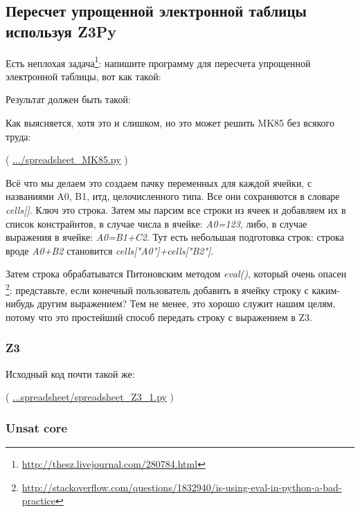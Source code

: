 \subsection{Пересчет упрощенной электронной таблицы используя Z3Py}

\renewcommand{\CURPATH}{equations/spreadsheet}

Есть неплохая задача\footnote{\url{http://thesz.livejournal.com/280784.html}}:
напишите программу для пересчета упрощенной электронной таблицы, вот как такой:



Результат должен быть такой:



Как выясняется, хотя это и слишком, но это может решить MK85 без всякого труда:



( \url{.../spreadsheet_MK85.py} )

Всё что мы делаем это создаем пачку переменных для каждой ячейки, с названиями 
A0, B1, итд, целочисленного типа.
Все они сохраняются в словаре \textit{cells[]}.
Ключ это строка.
Затем мы парсим все строки из ячеек и добавляем их в список констрайнтов, в случае числа в ячейке: \textit{A0=123},
либо, в случае выражения в ячейке: \textit{A0=B1+C2}.
Тут есть небольшая подготовка строк: строка вроде \textit{A0+B2} становится \textit{cells["A0"]+cells["B2"]}.

Затем строка обрабатыватся Питоновским методом \textit{eval()}, который очень опасен
\footnote{\url{http://stackoverflow.com/questions/1832940/is-using-eval-in-python-a-bad-practice}}:
представьте, если конечный пользователь добавить в ячейку строку с каким-нибудь другим выражением?
Тем не менее, это хорошо служит нашим целям, потому что это простейший способ передать строку с выражением в Z3.

\subsubsection{Z3}

Исходный код почти такой же:



( \url{...spreadsheet/spreadsheet_Z3_1.py} )

\subsubsection{Unsat core}

